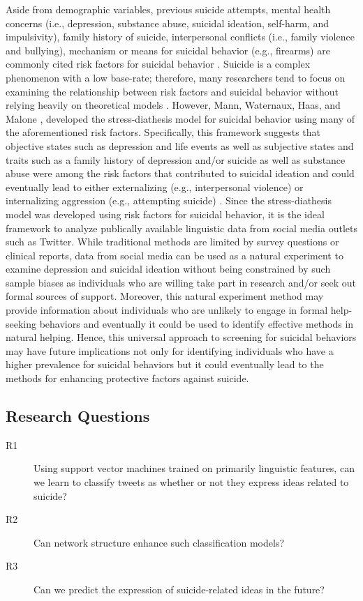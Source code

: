\documentclass[11pt]{article}
\begin{document}
	Aside from demographic variables, previous suicide attempts, mental health concerns (i.e., depression, substance abuse, suicidal ideation, self-harm, and impulsivity), family history of suicide, interpersonal conflicts (i.e., family violence and bullying), mechanism or means for suicidal behavior (e.g., firearms)  are commonly cited risk factors for suicidal behavior \cite{nock2008suicide,crosby2011self,gaynes2004screening,harriss2005suicidal,shaffer2004columbia,shaffer2004columbia,brown2000risk}. Suicide is a complex phenomenon with a low base-rate; therefore, many researchers tend to focus on examining the relationship between risk factors and suicidal behavior without relying heavily on theoretical models \cite{nock2008suicide} .  However, Mann, Waternaux, Haas, and Malone \cite{mann1999toward}, developed the stress-diathesis model for suicidal behavior using many of the aforementioned risk factors. Specifically, this framework suggests that objective states such as depression and life events as well as subjective states and traits such as a family history of depression and/or suicide as well as substance abuse were among the risk factors that contributed to suicidal ideation and could eventually lead to either externalizing (e.g., interpersonal violence) or internalizing aggression (e.g., attempting suicide) \cite{mann1999toward}.
	Since the stress-diathesis model was developed using risk factors for suicidal behavior, it is the ideal framework to analyze publically available linguistic data from social media outlets such as Twitter. While traditional methods are limited by survey questions or clinical reports, data from social media can be used as a natural experiment to examine depression and suicidal ideation without being constrained by such sample biases as individuals who are willing take part in research and/or seek out formal sources of support. Moreover, this natural experiment method may provide information about individuals who are unlikely to engage in formal help-seeking behaviors and eventually it could be used to identify effective methods in natural helping. Hence, this universal approach to screening for suicidal behaviors may have future implications not only for identifying individuals who have a higher prevalence for suicidal behaviors but it could eventually lead to the methods for enhancing protective factors against suicide.  
 

\subsection{Research Questions}
\begin{description}
\item[R1] Using support vector machines trained on primarily linguistic features, can we learn to classify tweets as whether or not they express ideas related to suicide?
\item[R2] Can network structure enhance such classification models?
\item[R3] Can we predict the expression of suicide-related ideas in the future?
\end{description}
\end{document}

